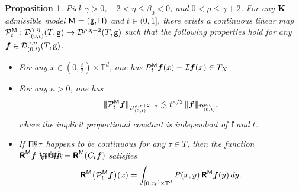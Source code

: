 \documentclass[10pt, reqno]{amsart}
\makeatletter
\numberwithin{subsection}{section}
\numberwithin{subsubsection}{subsection}
\numberwithin{equation}{section} %
\theoremstyle{mystyle}
\newtheorem{prop}[thm]{\hspace{-0.13cm} {Proposition}}%
\theoremstyle{mystyle2}
\theoremstyle{mystyle3}
\newcommand{\trino}[1]{|\!|\!|#1|\!|\!|}
\newcommand{\bsf}{\boldsymbol{f}}
\newcommand{\bbT}{\mathbb{T}}
\newcommand{\mcD}{\mathcal{D}}
\newcommand{\mcI}{\mathcal{I}}
\newcommand{\mcP}{\mathcal{P}}
\newcommand*{\defeq}{\mathrel{\rlap{%
                     \raisebox{0.3ex}{$\m@th\cdot$}}%
                     \raisebox{-0.3ex}{$\m@th\cdot$}}%
                     =}
\makeatother
\begin{document}
\medskip

\begin{prop} \label{PropNonAnticipative}
Pick $\gamma>0$, $-2<\eta\le\beta_0<0$, and $0<\rho\le\gamma+2$. For any $\bf K$-admissible model $\sf M=(g,\Pi)$ and $t\in(0,1]$, there exists a continuous linear map $\mcP_t^{\sf M}:\mcD_{(0,t)}^{\gamma,\eta}(T,{\sf g})\to\mcD^{\rho,\eta+2}(T,{\sf g})$ such that the following properties hold for any $\bsf\in\mcD_{(0,t)}^{\gamma,\eta}(T,{\sf g})$.
\begin{itemize}
\setlength{\itemsep}{0.1cm}
\item[(1)]
For any $x\in(0,\frac{t}2)\times\bbT^d$, one has $\mcP_t^{\sf M}\bsf(x)-\mcI\bsf(x)\in T_X$.
\item[(2)]
For any $\kappa>0$, one has
\begin{align}\label{ineq small factor improved}
\trino{\mcP_t^{\sf M}\bsf}_{\mcD^{\rho,\eta+2-\kappa}_{(0,t)}} 
\lesssim t^{\kappa/2}\,\trino{\bsf}_{\mcD^{\rho,\eta}_{(0,t)}},
\end{align}
where the implicit proportional constant is independent of $\bsf$ and $t$. 
\item[(3)]
If ${\sf\Pi}_x^{\sf g}\tau$ happens to be continuous for any $\tau\in T$, then the function $\textbf{\textsf{R}}^{\sf M}\bsf\defeq\textbf{\textsf{R}}^{\sf M}(C_t\bsf)$ satisfies
\begin{align}\label{eq KR=RK half plane}
\textbf{\textsf{R}}^{\sf M}\big(\mcP_t^{\sf M}\bsf\big)(x) = \int_{[0,x_0]\times\bbT^d }P(x,y)\,\textbf{\textsf{R}}^{\sf M}\bsf(y)\,dy.
\end{align}
\end{itemize}
\end{prop}

\medskip
\end{document}
